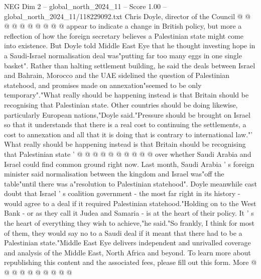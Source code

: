 \begin{textsample}{NEG Dim 2 – global\_north\_2024\_11 – Score 1.00 – global\_north\_2024\_11/118229092.txt}
Chris Doyle, director of the Council @ @ @ @ @ @ @ @ @ @ appear to indicate a change in British policy, but more a reflection of how the foreign secretary believes a Palestinian state might come into existence.
But Doyle told Middle East Eye that he thought investing hope in a Saudi-Israel normalisation deal was"putting far too many eggs in one single basket".
Rather than halting settlement building, he said the deals between Israel and Bahrain, Morocco and the UAE sidelined the question of Palestinian statehood, and promises made on annexation"seemed to be only temporary"."What really should be happening instead is that Britain should be recognising that Palestinian state.
Other countries should be doing likewise, particularly European nations,"Doyle said."Pressure should be brought on Israel so that it understands that there is a real cost to continuing the settlements, a cost to annexation and all that it is doing that is contrary to international law."' What really should be happening instead is that Britain should be recognising that Palestinian state ' @ @ @ @ @ @ @ @ @ @ over whether Saudi Arabia and Israel could find common ground right now.
Last month, Saudi Arabia ' s foreign minister said normalisation between the kingdom and Israel was"off the table"until there was a"resolution to Palestinian statehood".
Doyle meanwhile cast doubt that Israel ' s coalition government - the most far right in its history - would agree to a deal if it required Palestinian statehood."Holding on to the West Bank - or as they call it Judea and Samaria - is at the heart of their policy.
It ' s the heart of everything they wish to achieve,"he said."So frankly, I think for most of them, they would say no to a Saudi deal if it meant that there had to be a Palestinian state."Middle East Eye delivers independent and unrivalled coverage and analysis of the Middle East, North Africa and beyond.
To learn more about republishing this content and the associated fees, please fill out this form.
More @ @ @ @ @ @ @ @ @ @

\end{textsample}
